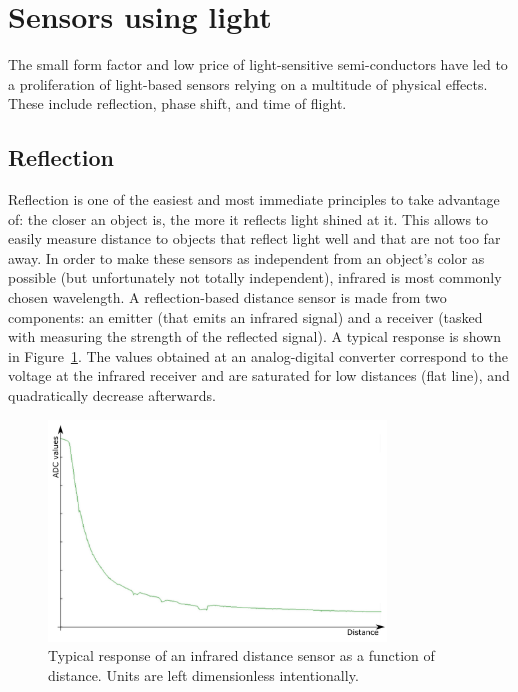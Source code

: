 \section{Sensors using light}\label{sec:sensors:light}

The small form factor and low price of light-sensitive semi-conductors have led to a proliferation of light-based sensors relying on a multitude of physical effects. These include reflection, phase shift, and time of flight.

\subsection{Reflection}
Reflection is one of the easiest and most immediate principles to take advantage of: the closer an object is, the more it reflects light shined at it. This allows to easily measure distance to objects that reflect light well and that are not too far away. In order to make these sensors as independent from an object's color as possible (but unfortunately not totally independent), infrared is most commonly chosen wavelength.
A reflection-based distance sensor is made from two components: an emitter (that emits an infrared signal) and a receiver (tasked with measuring the strength of the reflected signal). A typical response is shown in Figure~\ref{fig:epuckir}. The values obtained at an analog-digital converter correspond to the voltage at the infrared receiver and are saturated for low distances (flat line), and quadratically decrease afterwards.

\begin{figure}
	\centering
		\includegraphics[width=0.8\textwidth]{figs/epuckirsensor.png}
	\caption{Typical response of an infrared distance sensor as a function of distance. Units are left dimensionless intentionally.}
	\label{fig:epuckir}
\end{figure}


